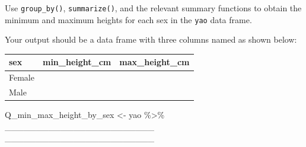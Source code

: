 \documentclass[
  letterpaper,
  DIV=11,
  numbers=noendperiod]{scrreprt}
\newenvironment{Shaded}{\begin{snugshade}}{\end{snugshade}}
\newcommand{\NormalTok}[1]{\textcolor[rgb]{0.00,0.23,0.31}{#1}}
\newcommand{\OtherTok}[1]{\textcolor[rgb]{0.00,0.23,0.31}{#1}}
\newcommand{\SpecialCharTok}[1]{\textcolor[rgb]{0.37,0.37,0.37}{#1}}
\begin{document}
\begin{tcolorbox}[enhanced jigsaw, titlerule=0mm, colback=white, left=2mm, breakable, opacitybacktitle=0.6, colbacktitle=quarto-callout-tip-color!10!white, colframe=quarto-callout-tip-color-frame, bottomtitle=1mm, opacityback=0, coltitle=black, arc=.35mm, toptitle=1mm, title=\textcolor{quarto-callout-tip-color}{\faLightbulb}\hspace{0.5em}{Practice}, leftrule=.75mm, toprule=.15mm, bottomrule=.15mm, rightrule=.15mm]

Use \texttt{group\_by()}, \texttt{summarize()}, and the relevant summary
functions to obtain the minimum and maximum heights for each sex in the
\texttt{yao} data frame.

Your output should be a data frame with three columns named as shown
below:

\begin{longtable}[]{@{}lll@{}}
\toprule\noalign{}
sex & min\_height\_cm & max\_height\_cm \\
\midrule\noalign{}
\endhead
\bottomrule\noalign{}
\endlastfoot
Female & & \\
Male & & \\
\end{longtable}

\begin{Shaded}
\begin{Highlighting}[]
\NormalTok{Q\_min\_max\_height\_by\_sex }\OtherTok{\textless{}{-}} 
\NormalTok{  yao }\SpecialCharTok{\%\textgreater{}\%} 
\NormalTok{  \_\_\_\_\_\_\_\_\_\_\_\_\_\_\_\_\_\_\_\_\_\_\_\_}
\NormalTok{  \_\_\_\_\_\_\_\_\_\_\_\_\_\_\_\_\_\_\_\_\_\_\_\_}
\end{Highlighting}
\end{Shaded}

\end{tcolorbox}
\end{document}
